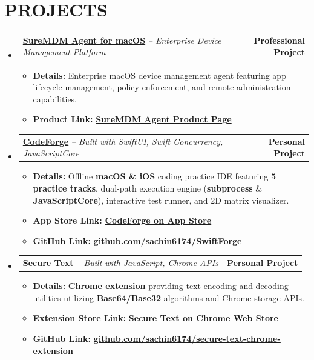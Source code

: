 \documentclass[letterpaper,11pt]{article}
\makeatletter
\newcommand{\resumeItem}[1]{
  \item\small{
    {#1 \vspace{-2pt}}
  }
}
\newcommand{\resumeProjectHeading}[2]{
    \item
    \begin{tabular*}{1.001\textwidth}{l@{\extracolsep{\fill}}r}
      \small#1 & \textbf{\small #2}\\
    \end{tabular*}\vspace{-7pt}
}
\newcommand{\resumeSubHeadingListStart}{\begin{itemize}[leftmargin=0.0in, label={}]}
\newcommand{\resumeSubHeadingListEnd}{\end{itemize}}
\newcommand{\resumeItemListStart}{\begin{itemize}}
\newcommand{\resumeItemListEnd}{\end{itemize}\vspace{-5pt}}
\makeatother
\begin{document}
\section{PROJECTS}
    \vspace{1pt}
    \resumeSubHeadingListStart
        \resumeProjectHeading
            {\textbf{\large{\underline{SureMDM Agent for macOS}}} \hspace{0.1cm} 
            \large{\textit{– Enterprise Device Management Platform}}}{Professional Project}
            \resumeItemListStart
                \resumeItem{\normalsize{\textbf{Details:} Enterprise macOS device management agent featuring app lifecycle management, policy enforcement, and remote administration capabilities.}}
                \resumeItem{\normalsize{\textbf{Product Link:} \href{https://www.42gears.com/products/mobile-device-management/suremdm-agent-for-macos-past-releases/}{\textbf{SureMDM Agent Product Page}}}}
            \resumeItemListEnd 
            \vspace{-9pt}

        \resumeProjectHeading
            {\textbf{\large{\underline{CodeForge}}} \hspace{0.1cm} 
            \large{\textit{– Built with SwiftUI, Swift Concurrency, JavaScriptCore}}}{Personal Project}
            \resumeItemListStart
                \resumeItem{\normalsize{\textbf{Details:} Offline \textbf{macOS \& iOS} coding practice IDE featuring \textbf{5 practice tracks}, dual-path execution engine (\textbf{subprocess} \& \textbf{JavaScriptCore}), interactive test runner, and 2D matrix visualizer.}}
                \resumeItem{\normalsize{\textbf{App Store Link:} \href{https://apps.apple.com/in/app/codeforge-dsa-interview-prep/id6787703716}{\textbf{CodeForge on App Store}}}}
                \resumeItem{\normalsize{\textbf{GitHub Link:} \href{https://github.com/sachin6174/SwiftForge}{\textbf{github.com/sachin6174/SwiftForge}}}}
            \resumeItemListEnd 
            \vspace{-9pt}

        \resumeProjectHeading
            {\textbf{\large{\underline{Secure Text}}} \hspace{0.1cm} 
            \large{\textit{– Built with JavaScript, Chrome APIs}}}{Personal Project}
            \resumeItemListStart
                \resumeItem{\normalsize{\textbf{Details:} \textbf{Chrome extension} providing text encoding and decoding utilities utilizing \textbf{Base64/Base32} algorithms and Chrome storage APIs.}}
                \resumeItem{\normalsize{\textbf{Extension Store Link:} \href{https://chromewebstore.google.com/detail/secure-text/ankgchfieiimiijhlcjcongijapefmei}{\textbf{Secure Text on Chrome Web Store}}}}
                \resumeItem{\normalsize{\textbf{GitHub Link:} \href{https://github.com/sachin6174/secure-text-chrome-extension}{\textbf{github.com/sachin6174/secure-text-chrome-extension}}}}
            \resumeItemListEnd 
            \vspace{-9pt}
    \resumeSubHeadingListEnd
\end{document}

